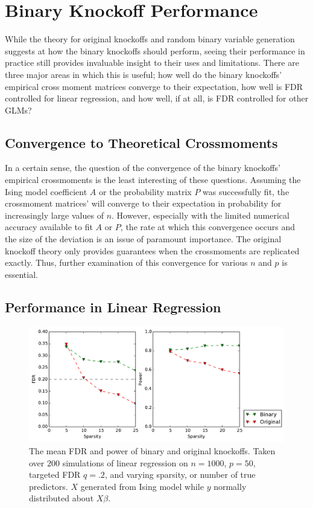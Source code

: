 \documentclass[11pt]{article}
\theoremstyle{definition}
\begin{document}
\section{Binary Knockoff Performance}
    While the theory for original knockoffs and random binary variable generation suggests at how the binary knockoffs should perform, seeing their performance in practice still provides invaluable insight to their uses and limitations. There are three major areas in which this is useful; how well do the binary knockoffs' empirical cross moment matrices converge to their expectation, how well is FDR controlled for linear regression, and how well, if at all, is FDR controlled for other GLMs?

\subsection{Convergence to Theoretical Crossmoments} 
    \FloatBarrier
        In a certain sense, the question of the convergence of the binary knockoffs' empirical crossmoments is the least interesting of these questions. Assuming the Ising model coefficient $A$ or the probability matrix $P$ was successfully fit, the crossmoment matrices' will converge to their expectation in probability for increasingly large values of $n$. However, especially with the limited numerical accuracy available to fit $A$ or $P$, the rate at which this convergence occurs and the size of the deviation is an issue of paramount importance. The original knockoff theory only provides guarantees when the crossmoments are replicated exactly. Thus, further examination of this convergence for various $n$ and $p$ is essential.

    \FloatBarrier
\subsection{Performance in Linear Regression} 
    \FloatBarrier
    
    \begin{figure}[h]
        \begin{center}
        \includegraphics[width=14cm]{images/lasso_FDR_power_50}
    \end{center}
    \caption{The mean FDR and power of binary and original knockoffs. Taken over $200$ simulations of linear regression on $n=1000$, $p=50$, targeted FDR $q=.2$, and varying sparsity, or number of true predictors. $X$ generated from Ising model while $y$ normally distributed about $X\beta$.}  
    \end{figure}
\end{document}
